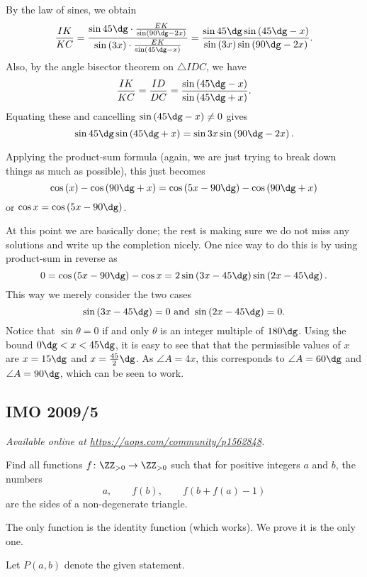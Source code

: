 \documentclass[11pt]{scrartcl}
\begin{document}
By the law of sines, we obtain
\[ \frac{IK}{KC} = \frac%
  {\sin 45\dg \cdot \frac{EK}{\sin \left( 90\dg - 2x \right)}}%
  {\sin \left( 3x \right) \cdot \frac{EK}{\sin \left( 45\dg-x \right)}}
  = \frac{\sin 45\dg \sin \left( 45\dg - x \right)}%
  {\sin \left( 3x \right) \sin \left( 90\dg - 2x \right)}. \]
Also, by the angle bisector theorem on $\triangle IDC$,
we have
\[ \frac{IK}{KC} = \frac{ID}{DC}
  = \frac{\sin \left( 45\dg-x \right)}{\sin\left( 45\dg+x \right)}. \]
Equating these and cancelling $\sin \left( 45\dg-x \right) \neq 0$ gives
\[ \sin 45\dg \sin \left( 45\dg + x \right)
  = \sin 3x \sin \left( 90\dg - 2x \right). \]

Applying the product-sum formula
(again, we are just trying to break down things as much as possible),
this just becomes
\[ \cos\left( x \right) - \cos \left( 90\dg + x \right)
  = \cos \left( 5x-90\dg \right) - \cos \left( 90\dg+x \right) \]
or $\cos x = \cos \left( 5x-90\dg \right)$.

At this point we are basically done;
the rest is making sure we do not miss any solutions
and write up the completion nicely.
One nice way to do this is by using product-sum in reverse as
\[ 0 = \cos \left( 5x-90\dg \right) - \cos x
  = 2 \sin \left( 3x - 45\dg \right) \sin \left( 2x-45\dg \right). \]
This way we merely consider the two cases
\[ \sin \left( 3x-45\dg \right) = 0 \text{ and }
  \sin \left( 2x - 45\dg \right) = 0. \]
Notice that $\sin\theta = 0$ if and only $\theta$
is an integer multiple of $180\dg$.
Using the bound $0\dg < x < 45\dg$,
it is easy to see that that the permissible values of $x$
are $x = 15\dg$ and $x = \frac{45}{2}\dg$.
As $\angle A = 4x$, this corresponds to $\angle A = 60\dg$
and $\angle A = 90\dg$, which can be seen to work.
\pagebreak

\subsection{IMO 2009/5}
\textsl{Available online at \url{https://aops.com/community/p1562848}.}
\begin{mdframed}[style=mdpurplebox,frametitle={Problem statement}]
Find all functions $f \colon \ZZ_{>0} \to \ZZ_{>0}$
such that for positive integers $a$ and $b$, the numbers
\[ a, \qquad f(b), \qquad f(b+f(a)-1) \]
are the sides of a non-degenerate triangle.
\end{mdframed}
The only function is the identity function (which works).
We prove it is the only one.

Let $P(a,b)$ denote the given statement.
\end{document}
